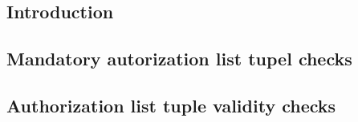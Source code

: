 \subsection{Introduction}                               \label{rlp auth: comparisons: intro}              
\subsection{Mandatory autorization list tupel checks}   \label{rlp auth: comparisons: mandatory checks}   
\subsection{Authorization list tuple validity checks}   \label{rlp auth: comparisons: validity checks}    
